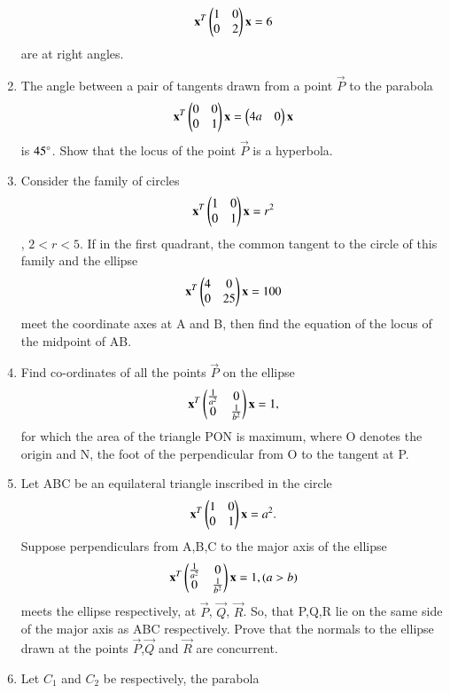 \documentclass[journal,12pt,twocolumn]{IEEEtran}
\begin{document}
\begin{enumerate}[label=\arabic*]
\begin{align}
    \mathbf{x}^T\begin{pmatrix}1&0\\0&2\end{pmatrix}\mathbf{x}=6
    \end{align} are at right angles.
    \item The angle between a pair of tangents drawn from a point $\vec{P}$ to the parabola
    \begin{align}
    \mathbf{x}^T\begin{pmatrix}0&0\\0&1\end{pmatrix}\mathbf{x}=\begin{pmatrix}4a&0\end{pmatrix}\mathbf{x}
    \end{align} is $45\degree$. Show that the locus of the point $\vec{P}$ is a hyperbola.
    \item Consider the family of circles 
    \begin{align}
    \mathbf{x}^T\begin{pmatrix}1&0\\0&1\end{pmatrix}\mathbf{x}=r^2
    \end{align}, $2<r<5$. If in the first quadrant, the common tangent to the circle of this family and the ellipse 
    \begin{align}
    \mathbf{x}^T\begin{pmatrix}4&0\\0&25\end{pmatrix}\mathbf{x}=100
    \end{align} meet the coordinate axes at A and B, then find the equation of the locus of the midpoint of AB.
    \item Find co-ordinates of all the points $\vec{P}$ on the ellipse 
    \begin{align}
    \mathbf{x}^T\begin{pmatrix}\frac{1}{a^2}&0\\0&\frac{1}{b^2}\end{pmatrix}\mathbf{x}=1,
    \end{align} for which the area of the triangle PON is maximum, where O denotes the origin and 			N, the foot of the perpendicular from O to the tangent at P.
    \item Let ABC be an equilateral triangle inscribed in the circle 
    \begin{align} 
    \mathbf{x}^T\begin{pmatrix}1&0\\0&1\end{pmatrix}\mathbf{x}=a^2.
    \end{align} Suppose perpendiculars from A,B,C to the major axis of the ellipse 
    \begin{align}
    \mathbf{x}^T\begin{pmatrix}\frac{1}{a^2}&0\\0&\frac{1}{b^2}\end{pmatrix}\mathbf{x}=1,(a>b)
    \end{align}  meets the ellipse respectively, at $\vec{P}$, $\vec{Q}$, $\vec{R}$. So, that 
    P,Q,R lie on the same side of the major axis as ABC respectively. Prove that the normals to the ellipse drawn at the points $\vec{P}$,$\vec{Q}$ and $\vec{R}$ are concurrent.
    \item Let $C_1$ and $C_2$ be respectively, the parabola 

\end{enumerate}
\end{document}
